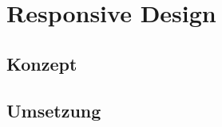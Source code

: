 \chapter{Responsive Design}
\section{Konzept} \label{sec:responsiveConcept}

\section{Umsetzung} \label{sec:responsiveImplementation}
